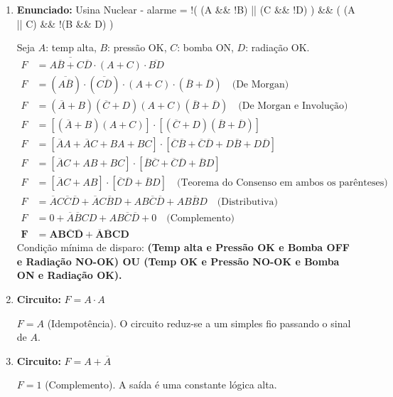 \documentclass[12pt]{article}
\begin{document}
\begin{enumerate}[label=\textbf{\arabic*.}]
\item \textbf{Enunciado:} Usina Nuclear - alarme = !( (A \&\& !B) || (C \&\& !D) ) \&\& ( (A || C) \&\& !(B \&\& D) )
\begin{solucao}
Seja $A$: temp alta, $B$: pressão OK, $C$: bomba ON, $D$: radiação OK.
\begin{align*}
    F &= \overline{A\overline{B} + C\overline{D}} \cdot (A + C) \cdot \overline{BD} \\
    F &= (\overline{A\overline{B}}) \cdot (\overline{C\overline{D}}) \cdot (A + C) \cdot (\overline{B} + \overline{D}) \quad \text{(De Morgan)} \\
    F &= (\overline{A} + B)(\overline{C} + D)(A + C)(\overline{B} + \overline{D}) \quad \text{(De Morgan e Involução)} \\
    F &= [(\overline{A} + B)(A + C)] \cdot [(\overline{C} + D)(\overline{B} + \overline{D})] \\
    F &= [\overline{A}A + \overline{A}C + BA + BC] \cdot [\overline{C}\overline{B} + \overline{C}\overline{D} + D\overline{B} + D\overline{D}] \\
    F &= [\overline{A}C + AB + BC] \cdot [\overline{B}\overline{C} + \overline{C}\overline{D} + \overline{B}D] \\
    F &= [\overline{A}C + AB] \cdot [\overline{C}\overline{D} + \overline{B}D] \quad \text{(Teorema do Consenso em ambos os parênteses)} \\
    F &= \overline{A}C\overline{C}\overline{D} + \overline{A}C\overline{B}D + AB\overline{C}\overline{D} + AB\overline{B}D \quad \text{(Distributiva)} \\
    F &= 0 + \overline{A}\overline{B}CD + AB\overline{C}\overline{D} + 0 \quad \text{(Complemento)} \\
    \mathbf{F} &= \mathbf{AB\overline{C}\overline{D} + \overline{A}\overline{B}CD}
\end{align*}
Condição mínima de disparo: \textbf{(Temp alta e Pressão OK e Bomba OFF e Radiação NO-OK) OU (Temp OK e Pressão NO-OK e Bomba ON e Radiação OK).}
\end{solucao}

\item \textbf{Circuito:} $F = A \cdot A$
\begin{solucao}
$F = A$ (Idempotência). O circuito reduz-se a um simples fio passando o sinal de $A$.
\end{solucao}

\item \textbf{Circuito:} $F = A + \overline{A}$
\begin{solucao}
$F = 1$ (Complemento). A saída é uma constante lógica alta.
\end{solucao}


\end{enumerate}
\end{document}

